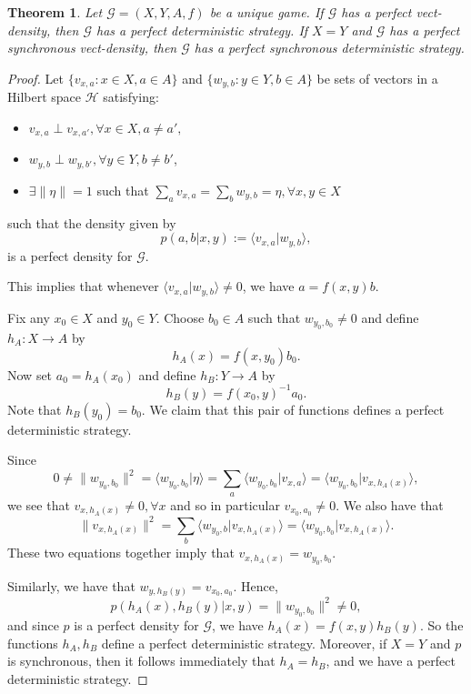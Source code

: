 \documentclass[11pt]{amsart}
\newtheorem{thm}{Theorem}[section]
\theoremstyle{definition}
\newcommand{\cl}[1]{\mathcal{#1}}
\begin{document}
\begin{thm} Let $\cl G=(X,Y,A,f)$ be a unique game.
  If $\cl G$ has a perfect vect-density, then $\cl G$ has a
  perfect deterministic strategy. If $X=Y$ and $\cl G$ has a perfect synchronous vect-density, then $\cl G$ has  a perfect synchronous deterministic strategy.
 \end{thm}
 \begin{proof} Let $\{ v_{x,a}: x \in X, a \in A \}$ and $\{ w_{y,b} : y \in Y, b \in A \}$ be sets of vectors in a Hilbert space $\cl H$ satisfying:
 \begin{itemize}
 \item $v_{x,a} \perp v_{x,a'}, \forall x \in X, a \ne a',$
 \item $w_{y,b} \perp w_{y,b'}, \forall y \in Y, b \ne b'$,
 \item $\exists \| \eta \|=1$ such that $\sum_a v_{x,a} = \sum_b w_{y,b} = \eta,  \forall x,y \in X$
 \end{itemize}
 such that the density given by
 \[ p(a,b | x,y) := \langle v_{x,a} \vert w_{y,b} \rangle,\]
 is a perfect density for $\cl G$.

 This implies that whenever $\langle v_{x,a} \vert w_{y,b} \rangle \ne0$, we have $a = f(x,y)b$.

 Fix any $x_0\in X$ and $y_0\in Y$. Choose $b_0\in A$
 such that $w_{y_0,b_0} \ne 0$ and define $h_A:X \to A$ by
 \[ h_A(x) = f(x,y_0)b_0.\]
 Now set $a_0 = h_A(x_0)$ and define $h_B: Y \to A$ by
 \[ h_B(y) = f(x_0,y)^{-1}a_0.\]
 Note that $h_B(y_0)= b_0$.
 We claim that this pair of functions defines a perfect deterministic strategy.

  Since
 \[ 0 \ne \|w_{y_0,b_0}\|^2 = \langle w_{y_0,b_0} \vert \eta \rangle = \sum_a \langle w_{y_0,b_0} \vert v_{x,a} \rangle = \langle w_{y_0, b_0} \vert v_{x, h_A(x)} \rangle,\]
 we see that $v_{x, h_A(x)} \ne 0, \forall x$ and so in particular $v_{x_0, a_0} \ne 0.$
 We also have that
 \[ \|v_{x, h_A(x)} \|^2 = \sum_b \langle w_{y_0,b} \vert v_{x, h_A(x)} \rangle = \langle w_{y_0,b_0} \vert v_{x, h_A(x)} \rangle.\]
 These two equations together imply that $v_{x,h_A(x)} = w_{y_0, b_0}$.

 Similarly, we have that $w_{y, h_B(y)} = v_{x_0, a_0}$.  Hence,
 \[ p(h_A(x),h_B(y) | x,y) = \|w_{y_0, b_0} \|^2 \ne 0,\]
 and since $p$ is a perfect density for $\cl G$, we have $h_A(x)=f(x,y)h_B(y)$. So the functions $h_A,h_B$ define a perfect deterministic strategy. Moreover, if $X=Y$ and $p$ is synchronous, then it follows immediately that $h_A=h_B$, and we have a perfect deterministic strategy.
 \end{proof}
\end{document}
